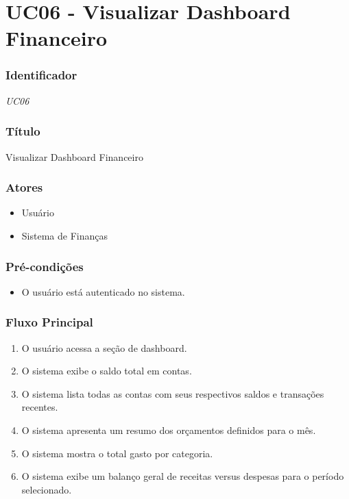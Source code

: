 \chapter{UC06 - Visualizar Dashboard Financeiro}
\label{apendiceUC06}

\subsection*{Identificador}
\textit{UC06}

\subsection*{Título}
Visualizar Dashboard Financeiro

\subsection*{Atores}
\begin{addmargin}[1.5cm]{0cm}
    \begin{itemize}
        \item Usuário
        \item Sistema de Finanças
    \end{itemize}
\end{addmargin}

\subsection*{Pré-condições}
\begin{addmargin}[1.5cm]{0cm}
    \begin{itemize}
        \item O usuário está autenticado no sistema.
    \end{itemize}
\end{addmargin}

\subsection*{Fluxo Principal}
\begin{addmargin}[1.5cm]{0cm}
    \begin{enumerate}
        \item O usuário acessa a seção de dashboard.
        \item O sistema exibe o saldo total em contas.
        \item O sistema lista todas as contas com seus respectivos saldos e transações recentes.
        \item O sistema apresenta um resumo dos orçamentos definidos para o mês.
        \item O sistema mostra o total gasto por categoria.
        \item O sistema exibe um balanço geral de receitas versus despesas para o período selecionado.
    \end{enumerate}
\end{addmargin}

